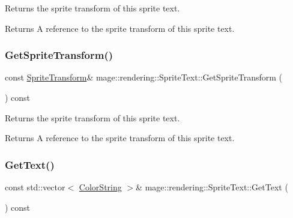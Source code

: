 Returns the sprite transform of this sprite text.

\begin{DoxyReturn}{Returns}
A reference to the sprite transform of this sprite text. 
\end{DoxyReturn}
\mbox{\label{classmage_1_1rendering_1_1_sprite_text_a9b0bc8d9c8e123d49bd6cc9dcc35c06d}} 
\subsubsection{\texorpdfstring{Get\+Sprite\+Transform()}{GetSpriteTransform()}\hspace{0.1cm}{\footnotesize\ttfamily [2/2]}}
{\footnotesize\ttfamily const \mbox{\hyperlink{classmage_1_1_sprite_transform}{Sprite\+Transform}}\& mage\+::rendering\+::\+Sprite\+Text\+::\+Get\+Sprite\+Transform (\begin{DoxyParamCaption}{ }\end{DoxyParamCaption}) const\hspace{0.3cm}{\ttfamily [noexcept]}}

Returns the sprite transform of this sprite text.

\begin{DoxyReturn}{Returns}
A reference to the sprite transform of this sprite text. 
\end{DoxyReturn}
\mbox{\label{classmage_1_1rendering_1_1_sprite_text_a3a07e4043ce7058cb157111738c664cb}} 
\subsubsection{\texorpdfstring{Get\+Text()}{GetText()}}
{\footnotesize\ttfamily const std\+::vector$<$ \mbox{\hyperlink{classmage_1_1rendering_1_1_color_string}{Color\+String}} $>$\& mage\+::rendering\+::\+Sprite\+Text\+::\+Get\+Text (\begin{DoxyParamCaption}{ }\end{DoxyParamCaption}) const\hspace{0.3cm}{\ttfamily [noexcept]}}

